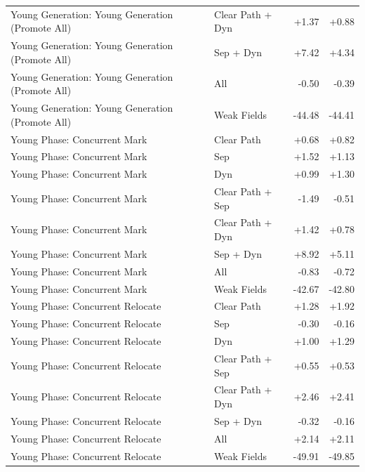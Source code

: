 \begin{table}[t]
\begin{tabular}{llrr}
Young Generation: Young Generation (Promote All) & Clear Path + Dyn & +1.37 & +0.88 \\
Young Generation: Young Generation (Promote All) & Sep + Dyn & +7.42 & +4.34 \\
Young Generation: Young Generation (Promote All) & All & -0.50 & -0.39 \\
Young Generation: Young Generation (Promote All) & Weak Fields & -44.48 & -44.41 \\
Young Phase: Concurrent Mark & Clear Path & +0.68 & +0.82 \\
Young Phase: Concurrent Mark & Sep & +1.52 & +1.13 \\
Young Phase: Concurrent Mark & Dyn & +0.99 & +1.30 \\
Young Phase: Concurrent Mark & Clear Path + Sep & -1.49 & -0.51 \\
Young Phase: Concurrent Mark & Clear Path + Dyn & +1.42 & +0.78 \\
Young Phase: Concurrent Mark & Sep + Dyn & +8.92 & +5.11 \\
Young Phase: Concurrent Mark & All & -0.83 & -0.72 \\
Young Phase: Concurrent Mark & Weak Fields & -42.67 & -42.80 \\
Young Phase: Concurrent Relocate & Clear Path & +1.28 & +1.92 \\
Young Phase: Concurrent Relocate & Sep & -0.30 & -0.16 \\
Young Phase: Concurrent Relocate & Dyn & +1.00 & +1.29 \\
Young Phase: Concurrent Relocate & Clear Path + Sep & +0.55 & +0.53 \\
Young Phase: Concurrent Relocate & Clear Path + Dyn & +2.46 & +2.41 \\
Young Phase: Concurrent Relocate & Sep + Dyn & -0.32 & -0.16 \\
Young Phase: Concurrent Relocate & All & +2.14 & +2.11 \\
Young Phase: Concurrent Relocate & Weak Fields & -49.91 & -49.85 \\
\bottomrule
\end{tabular}
\end{table}
